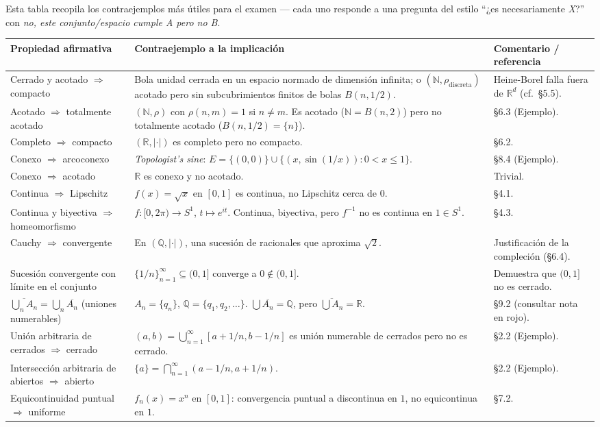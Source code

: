 \documentclass[11pt,twoside]{article}
\newcommand{\R}{\mathbb{R}}
\newcommand{\Q}{\mathbb{Q}}
\newcommand{\N}{\mathbb{N}}
\begin{document}
Esta tabla recopila los contraejemplos más útiles para el examen --- cada uno responde a una pregunta del estilo ``¿es necesariamente \textit{X}?'' con \textit{no, este conjunto/espacio cumple A pero no B}.

\renewcommand{\arraystretch}{1.35}
\begin{longtable}{p{} p{} p{}}
\hline
\textbf{Propiedad afirmativa} & \textbf{Contraejemplo a la implicación} & \textbf{Comentario / referencia} \\
\hline
\endhead

Cerrado y acotado $\Rightarrow$ compacto & Bola unidad cerrada en un espacio normado de dimensión infinita; o $(\N, \rho_{\mathrm{discreta}})$ acotado pero sin subcubrimientos finitos de bolas $B(n,1/2)$. & Heine-Borel falla fuera de $\R^{d}$ (cf.\ §5.5).\\
\hline
Acotado $\Rightarrow$ totalmente acotado & $(\N, \rho)$ con $\rho(n,m)=1$ si $n\neq m$. Es acotado ($\N=B(n,2)$) pero no totalmente acotado ($B(n,1/2)=\{n\}$). & §6.3 (Ejemplo).\\
\hline
Completo $\Rightarrow$ compacto & $(\R, |\cdot|)$ es completo pero no compacto. & §6.2.\\
\hline
Conexo $\Rightarrow$ arcoconexo & \emph{Topologist's sine}: $E = \{(0,0)\}\cup\{(x,\sin(1/x)) : 0<x\leq 1\}$. & §8.4 (Ejemplo).\\
\hline
Conexo $\Rightarrow$ acotado & $\R$ es conexo y no acotado. & Trivial.\\
\hline
Continua $\Rightarrow$ Lipschitz & $f(x)=\sqrt{x}$ en $[0,1]$ es continua, no Lipschitz cerca de $0$. & §4.1.\\
\hline
Continua y biyectiva $\Rightarrow$ homeomorfismo & $f:[0,2\pi)\to S^{1}$, $t\mapsto e^{it}$. Continua, biyectiva, pero $f^{-1}$ no es continua en $1\in S^{1}$. & §4.3.\\
\hline
Cauchy $\Rightarrow$ convergente & En $(\Q, |\cdot|)$, una sucesión de racionales que aproxima $\sqrt{2}$. & Justificación de la compleción (§6.4).\\
\hline
Sucesión convergente con límite en el conjunto & $\{1/n\}_{n=1}^{\infty}\subseteq (0,1]$ converge a $0\notin (0,1]$. & Demuestra que $(0,1]$ no es cerrado.\\
\hline
$\overline{\bigcup_{n} A_{n}} = \bigcup_{n} \overline{A_{n}}$ (uniones numerables) & $A_{n}=\{q_{n}\}$, $\Q=\{q_{1},q_{2},\dots\}$. $\bigcup\overline{A_{n}}=\Q$, pero $\overline{\bigcup A_{n}}=\R$. & §9.2 (consultar nota en rojo).\\
\hline
Unión arbitraria de cerrados $\Rightarrow$ cerrado & $(a,b) = \bigcup_{n=1}^{\infty} [a+1/n, b-1/n]$ es unión numerable de cerrados pero no es cerrado. & §2.2 (Ejemplo).\\
\hline
Intersección arbitraria de abiertos $\Rightarrow$ abierto & $\{a\} = \bigcap_{n=1}^{\infty} (a-1/n, a+1/n)$. & §2.2 (Ejemplo).\\
\hline
Equicontinuidad puntual $\Rightarrow$ uniforme & $f_{n}(x)=x^{n}$ en $[0,1]$: convergencia puntual a discontinua en $1$, no equicontinua en $1$. & §7.2.\\
\hline
\end{longtable}
\end{document}
